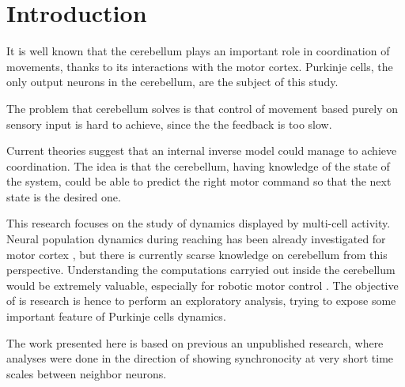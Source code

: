 \section{Introduction}

It is well known that the cerebellum plays an important role in coordination of movements, thanks to its interactions with the motor cortex. Purkinje cells, the only output neurons in the cerebellum, are the subject of this study. 

The problem that cerebellum solves is that control of movement based purely on sensory input is hard to achieve, since the the feedback is too slow.

Current theories suggest that an internal inverse model \cite{wolpert1998internal} could manage to achieve coordination. The idea is that the cerebellum, having knowledge of the state of the system, could be able to predict the right motor command so that the next state is the desired one.

This research focuses on the study of dynamics displayed by multi-cell activity. Neural population dynamics during reaching has been already investigated for motor cortex \cite{churchland2012neural}, but there is currently scarse knowledge on cerebellum from this perspective.
Understanding the computations carryied out inside the cerebellum would be extremely valuable, especially for robotic motor control \cite{casellato2014adaptive}. The objective of is research is hence to perform an exploratory analysis, trying to expose some important feature of Purkinje cells dynamics.

The work presented here is based on previous an unpublished research, where analyses were done in the direction of showing synchronocity at very short time scales between neighbor neurons. 
